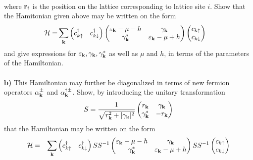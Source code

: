 \begin{problem}
\begin{eqnarray}
	\end{eqnarray}
	where ${\bf r}_i$ is the position on the lattice corresponding to lattice site $i$. Show that the Hamitonian given above may be written on the form
	\begin{align}
		\begin{split}
			\mathcal{H} =&   \sum_{{\bf k}} 
			\begin{pmatrix} c_{k\uparrow}^\dagger & c_{k \downarrow}^\dagger  \end{pmatrix}
			\begin{pmatrix} \varepsilon_{{\bf k}}-\mu - h & \gamma_{{\bf k}} \\ \gamma_{{\bf k}}^{*} & \varepsilon_{{\bf k}} - \mu + h \end{pmatrix}  
			\begin{pmatrix} c_{k \uparrow} \\ c_{ k\downarrow}  \end{pmatrix}
		\end{split} \nonumber 
	\end{align}
	and give expressions for $\varepsilon_{{\bf k}}, \gamma_{{\bf k}}, \gamma_{{\bf k}}^{*}$ as well as $\mu$ and $h$, in terms of the parameters of the Hamiltonian.  
	\ \\
	\ \\
	{\bf b)} This Hamiltonian may further be diagonalized in terms of new fermion operators $\alpha^{\pm}_{{\bf k}}$ and $\alpha^{\dagger \pm}_{{\bf k}}$. Show, by introducing the unitary transformation
	\begin{eqnarray}
		S = \frac{1}{\sqrt{r_{{\bf k}}^2  + | \gamma_{{\bf k}} |^2}}\begin{pmatrix} r_{{\bf k}} & \gamma_{{\bf k}} \\ \gamma_{{\bf k}}^{*} & -r_{{\bf k}} \end{pmatrix}  \nonumber 
	\end{eqnarray}
	that the Hamiltonian may be written on the form
	\begin{eqnarray}
		\Ha & =&   \sum_{{\bf k}} 
		\begin{pmatrix} c_{k\uparrow}^\dagger & c_{k \downarrow}^\dagger  \end{pmatrix} S S^{-1}
		\begin{pmatrix} \varepsilon_{{\bf k}}-\mu - h & \gamma_{{\bf k}} \\ \gamma_{{\bf k}}^{*} & \varepsilon_{{\bf k}} - \mu + h \end{pmatrix}   S S^{-1}
		\begin{pmatrix} c_{k \uparrow} \\ c_{ k\downarrow}  \end{pmatrix} \nonumber \\

\end{eqnarray}
\end{problem}
